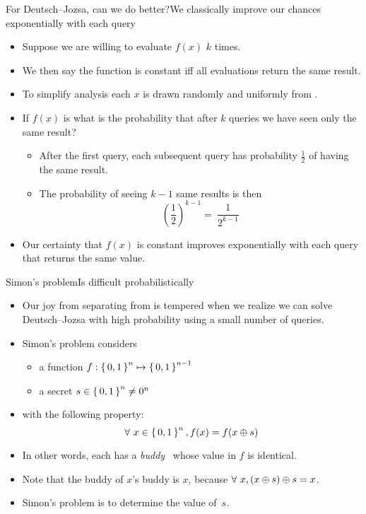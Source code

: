 \begin{frame}{For Deutsch--Jozsa, can we do better?}{We classically improve our chances exponentially with each query}

\begin{itemize}[<+->]
    \item Suppose we are willing to evaluate $f(x)$ $k$ times.
    \item We then say the function is constant iff all evaluations return the same result.
    \item To simplify analysis each $x$ is drawn randomly and uniformly from .
    \item If $f(x)$ is  what is the probability that after $k$ queries we have seen only the same result?
    \begin{itemize}
        \item After the first query, each subsequent query has probability $\frac{1}{2}$ of having the same result.
        \item The probability of seeing $k-1$ same results is then \[\left(\frac{1}{2}\right)^{k-1} =\ \frac{1}{2^{k-1}}\]
    \end{itemize}
    \item Our certainty that $f(x)$ is constant improves exponentially with each query that returns the same value.
\end{itemize}
    
\end{frame}

\begin{frame}{Simon's problem}{Is difficult probabilistically}
\begin{itemize}[<+->]
    \item Our joy from separating  from  is tempered when we realize we can solve Deutsch--Jozsa with high probability using a small number of queries.
    \item Simon's problem considers 
    \begin{itemize}
        \item a function $f: \left\{\,0,1\,\right\}^{n}\mapsto \left\{\,0,1\,\right\}^{n-1}$
        \item a secret $s\in \left\{\,0,1\,\right\}^{n} \not= 0^{n}$
    \end{itemize}
    \item with the following property:
    \[\forall\ x\in \left\{\,0,1\,\right\}^{n}, f(x)=f(x\oplus s) \]
    \item In other words, each  has a \emph{buddy}~ whose value in $f$ is identical.
    \item Note that the buddy of $x$'s buddy is $x$, because
    $\forall\ x, (x\oplus s)\oplus s=x$.
    \item \alert{Simon's problem is to determine the value of~$s$.}
\end{itemize}
\end{frame}

